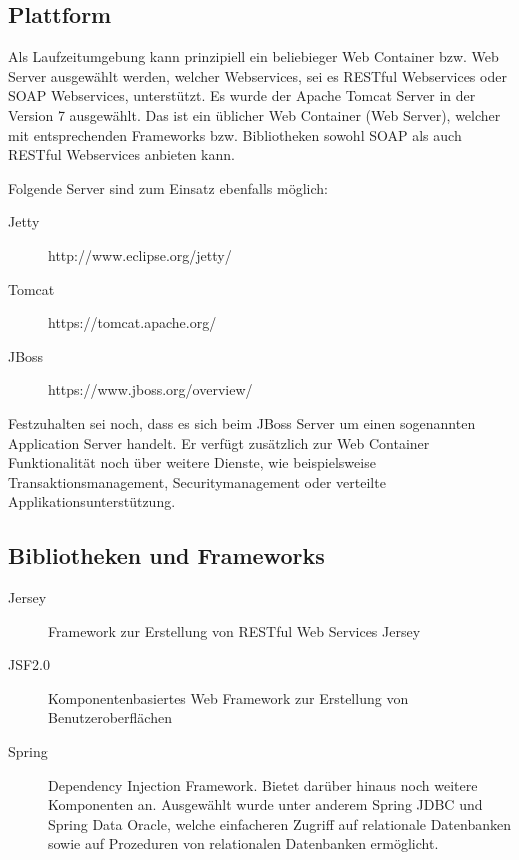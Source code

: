 \subsection{Plattform}  \label{sec:plattform}
Als Laufzeitumgebung kann prinzipiell ein beliebieger Web Container bzw. Web Server ausgewählt werden, welcher Webservices, sei es \gls{REST}ful \glspl{Webservice} oder \gls{SOAP} \glspl{Webservice}, unterstützt. 
Es wurde der \gls{Apache Tomcat} Server in der Version 7 ausgewählt. Das ist ein üblicher Web Container (Web Server), welcher mit entsprechenden Frameworks bzw. Bibliotheken sowohl \gls{SOAP} als auch \gls{REST}ful \glspl{Webservice} anbieten kann. 

Folgende Server sind zum Einsatz ebenfalls möglich:

\begin{description}
\item[Jetty] http://www.eclipse.org/jetty/
\item[Tomcat] https://tomcat.apache.org/
\item[JBoss] https://www.jboss.org/overview/
\end{description}

Festzuhalten sei noch, dass es sich beim JBoss Server um einen sogenannten Application Server handelt. Er verfügt zusätzlich zur Web Container Funktionalität noch über weitere Dienste, wie beispielsweise Transaktionsmanagement, Securitymanagement oder verteilte Applikationsunterstützung. 

\subsection{Bibliotheken und Frameworks} \label{sec:bibliotheken_und_frameworks}
\begin{description}

\item[Jersey] Framework zur Erstellung von RESTful Web Services \gls{Jersey}
\item[JSF2.0] Komponentenbasiertes Web Framework zur Erstellung von Benutzeroberflächen 
\item[Spring] Dependency Injection Framework. Bietet darüber hinaus noch weitere Komponenten an. Ausgewählt wurde unter anderem \gls{Spring} JDBC und \gls{Spring} Data Oracle, welche einfacheren Zugriff auf relationale Datenbanken sowie auf Prozeduren von relationalen Datenbanken ermöglicht.  
    
\end{description}

